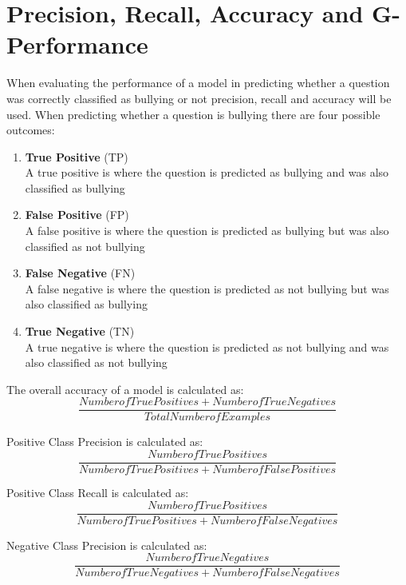 \section{Precision, Recall, Accuracy and G-Performance}
\label{section:2.3}

When evaluating the performance of a model in predicting whether a question was correctly classified as bullying or not precision, recall and accuracy will be used. When predicting whether a question is bullying there are four possible outcomes:

\begin{enumerate}

	\item \textbf{True Positive} (TP)\\
	A true positive is where the question is predicted as bullying and was also classified as bullying
	\item \textbf{False Positive} (FP) \\
	A false positive is where the question is predicted as bullying but was also classified as not bullying
	\item \textbf{False Negative} (FN)\\
	A false negative is where the question is predicted as not bullying but was also classified as bullying
	\item \textbf{True Negative} (TN)\\
	A true negative is where the question is predicted as not bullying and was also classified as not bullying

\end{enumerate}

The overall accuracy of a model is calculated as:
\begin{equation}
     \frac{Number of True Positives + Number of True Negatives}{Total Number of Examples}
\end{equation}

Positive Class Precision is calculated as:
\begin{equation}
     \frac{Number of True Positives}{Number of True Positives + Number of False Positives}
\end{equation}

Positive Class Recall is calculated as:
\begin{equation}
     \frac{Number of True Positives}{Number of True Positives + Number of False Negatives}
\end{equation} 

Negative Class Precision is calculated as:
\begin{equation}
     \frac{Number of True Negatives}{Number of True Negatives + Number of False Negatives}
\end{equation}

